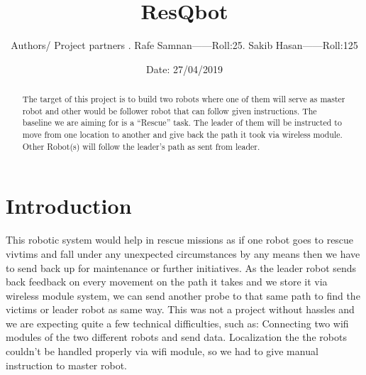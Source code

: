 \documentclass{Resources/UoBLab1}
\begin{document}

\title{ResQbot}
\vspace{3mm}\vspace{3mm}
\date{Date: 27/04/2019}
\author{Authors/ Project partners
. Rafe Samnan------Roll:25. Sakib Hasan------Roll:125}

\maketitle

\begin{abstract}
The target of this project is to build two robots where one of them will serve as master robot and other would be follower robot that can follow given instructions. The baseline we are aiming for is a “Rescue” task. The leader of them will be instructed to move  from one location to another and give back the path it took via wireless module. Other Robot(s) will follow the leader's path as sent from leader.
\end{abstract}


\section{Introduction}
This robotic system would help in rescue missions as if one robot goes to rescue vivtims and fall under any unexpected circumstances by any means then we have to send back up for maintenance or further initiatives. As the leader robot sends back feedback on every movement on the path it takes and we store it via wireless module system, we can send another probe to that same path to find the victims or leader robot as same way.\newline
This was not a project without hassles and we are expecting quite a few technical difficulties, such as:\newline
Connecting two wifi modules of the two different robots and send data. \newline
Localization the the robots couldn't be handled properly via wifi module, so we had to give manual instruction to master robot.
\end{document}
